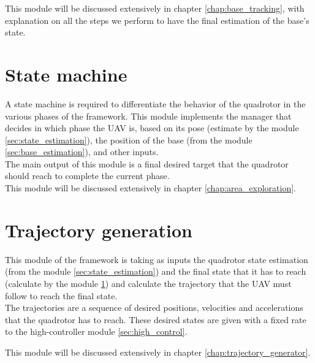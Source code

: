 This module will be discussed extensively in chapter \ref{chap:base_tracking}, with explanation on all the steps we perform to have the final estimation of the base's state.

\section{State machine} \label{sec:area_exploration}
A state machine is required to differentiate the behavior of the quadrotor in the various phases of the framework. This module implements the manager that decides in which phase the UAV is, based on its pose (estimate by the module \ref{sec:state_estimation}), the position of the base (from the module \ref{sec:base_estimation}), and other inputs.\\
The main output of this module is a final desired target that the quadrotor should reach to complete the current phase.\\
This module will be discussed extensively in chapter \ref{chap:area_exploration}.


\section{Trajectory generation}
This module of the framework is taking as inputs the quadrotor state estimation (from the module \ref{sec:state_estimation}) and the final state that it has to reach (calculate by the module \ref{sec:area_exploration}) and calculate the trajectory that the UAV must follow to reach the final state.\\
The trajectories are a sequence of desired positions, velocities and accelerations that the quadrotor has to reach. These desired states are given with a fixed rate to the high-controller module \ref{sec:high_control}.

This module will be discussed extensively in chapter \ref{chap:trajectory_generator}.

